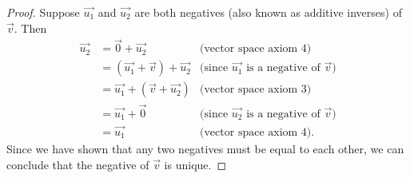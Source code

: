 \documentclass[12pt]{article}
\begin{document}
\begin{enumerate}
\begin{proof}
                      Suppose $\vec{u_1}$ and $\vec{u_2}$ are both negatives (also known as additive inverses) of $\vec{v}$. Then
                      \begin{align*}
                              \vec{u_2} & = \vec{0} + \vec{u_2}                & \textrm{(vector space axiom 4)}                         \\
                                        & = (\vec{u_1} + \vec{v}) +  \vec{u_2} & \textrm{(since $\vec{u_1}$ is a negative of $\vec{v}$)} \\
                                        & = \vec{u_1} + (\vec{v} +  \vec{u_2}) & \textrm{(vector space axiom 3)}                         \\
                                        & = \vec{u_1} + \vec{0}                & \textrm{(since $\vec{u_2}$ is a negative of $\vec{v}$)} \\
                                        & = \vec{u_1}                          & \textrm{(vector space axiom 4)}.
                      \end{align*}
                      Since we have shown that any two negatives must be equal to each other, we can conclude that the negative of $\vec{v}$ is unique.
              \end{proof}


\end{enumerate}
\end{document}
